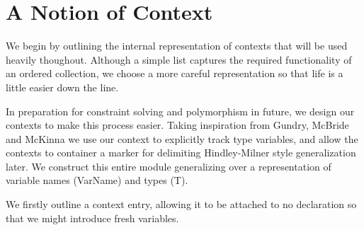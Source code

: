 \section{A Notion of Context}


We begin by outlining the internal representation of contexts that will be used
heavily thoughout. Although a simple list captures the required functionality of
an ordered collection, we choose a more careful representation so that life is
a little easier down the line.

In preparation for constraint solving and polymorphism in future, we design our
contexts to make this process easier. Taking inspiration from Gundry, McBride
and McKinna \cite{TypeInferenceInContext} we use our context to explicitly track
type variables, and allow the contexts to container a marker for delimiting
Hindley-Milner style generalization later. We construct this entire module
generalizing over a representation of variable names (VarName) and types (T).

We firstly outline a context entry, allowing it to be attached to no declaration
so that we might introduce fresh variables.

\begin{code}%
\>[0]\AgdaSpace{}%
\AgdaSpace{}%
\AgdaSymbol{:}\AgdaSpace{}%
\AgdaSpace{}%
\<%
\\
\>[0][@{}l@{\AgdaIndent{0}}]%
\>[2]%
\>[5]\AgdaSymbol{:}\AgdaSpace{}%
\AgdaSpace{}%
\AgdaSpace{}%
\<%
\\
%
\>[2]%
\>[5]\AgdaSymbol{:}\AgdaSpace{}%
\<%
\\
%
\\[\AgdaEmptyExtraSkip]%
\>[0]\AgdaSpace{}%
\AgdaSpace{}%
\AgdaSymbol{:}\AgdaSpace{}%
\AgdaSpace{}%
\<%
\\
\>[0][@{}l@{\AgdaIndent{0}}]%
\>[2]%
\>[8]\AgdaSymbol{:}%
\>[11]\AgdaSpace{}%
\AgdaSpace{}%
\AgdaSpace{}%
\AgdaSpace{}%
\<%
\\
%
\>[2]%
\>[8]\AgdaSymbol{:}%
\>[11]\<%
\end{code}

